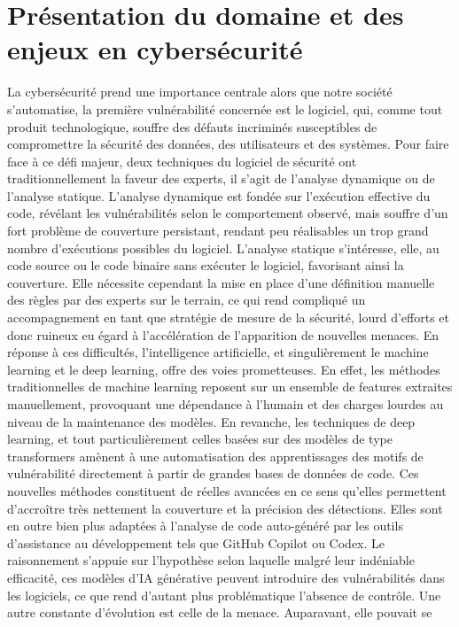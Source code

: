 \chapter{Présentation du domaine et des enjeux en cybersécurité}
    La cybersécurité prend une importance centrale alors que notre société s’automatise, la
première vulnérabilité concernée est le logiciel, qui, comme tout produit technologique,
souffre des défauts incriminés susceptibles de compromettre la sécurité des données, des
utilisateurs et des systèmes. Pour faire face à ce défi majeur, deux techniques du logiciel de
sécurité ont traditionnellement la faveur des experts, il s’agit de l’analyse dynamique ou de
l’analyse statique. L’analyse dynamique est fondée sur l’exécution effective du code,
révélant les vulnérabilités selon le comportement observé, mais souffre d’un fort problème
de couverture persistant, rendant peu réalisables un trop grand nombre d’exécutions
possibles du logiciel. L’analyse statique s’intéresse, elle, au code source ou le code binaire
sans exécuter le logiciel, favorisant ainsi la couverture. Elle nécessite cependant la mise en
place d’une définition manuelle des règles par des experts sur le terrain, ce qui rend
compliqué un accompagnement en tant que stratégie de mesure de la sécurité, lourd
d’efforts et donc ruineux eu égard à l’accélération de l’apparition de nouvelles menaces.
En réponse à ces difficultés, l’intelligence artificielle, et singulièrement le machine learning et
le deep learning, offre des voies prometteuses. En effet, les méthodes traditionnelles de
machine learning reposent sur un ensemble de features extraites manuellement, provoquant
une dépendance à l’humain et des charges lourdes au niveau de la maintenance des
modèles. En revanche, les techniques de deep learning, et tout particulièrement celles
basées sur des modèles de type transformers amènent à une automatisation des
apprentissages des motifs de vulnérabilité directement à partir de grandes bases de
données de code.
Ces nouvelles méthodes constituent de réelles avancées en ce sens qu’elles permettent
d’accroître très nettement la couverture et la précision des détections. Elles sont en outre
bien plus adaptées à l’analyse de code auto-généré par les outils d’assistance au
développement tels que GitHub Copilot ou Codex. Le raisonnement s’appuie sur l’hypothèse
selon laquelle malgré leur indéniable efficacité, ces modèles d’IA générative peuvent
introduire des vulnérabilités dans les logiciels, ce que rend d’autant plus problématique
l’absence de contrôle.
Une autre constante d’évolution est celle de la menace. Auparavant, elle pouvait se
